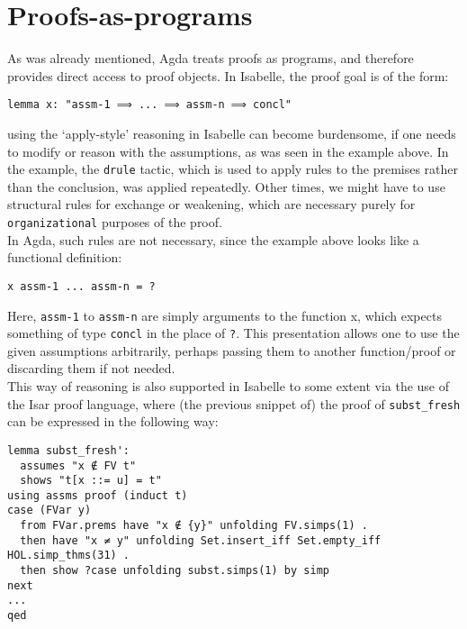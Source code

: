 \documentclass[a4paper, 12pt, twoside]{style/ociamthesis}
\theoremstyle{plain}
\theoremstyle{definition}
\theoremstyle{remark}
\begin{document}
\section{Proofs-as-programs}\label{proofs-as-programs}

\label{proofAsProg}

As was already mentioned, Agda treats proofs as programs, and therefore
provides direct access to proof objects. In Isabelle, the proof goal is
of the form:

\begin{verbatim}
lemma x: "assm-1 ⟹ ... ⟹ assm-n ⟹ concl"
\end{verbatim}

using the `apply-style' reasoning in Isabelle can become burdensome, if
one needs to modify or reason with the assumptions, as was seen in the
example above. In the example, the \texttt{drule} tactic, which is used
to apply rules to the premises rather than the conclusion, was applied
repeatedly. Other times, we might have to use structural rules for
exchange or weakening, which are necessary purely for
\texttt{organizational} purposes of the proof.\\
In Agda, such rules are not necessary, since the example above looks
like a functional definition:

\begin{verbatim}
x assm-1 ... assm-n = ?
\end{verbatim}

Here, \texttt{assm-1} to \texttt{assm-n} are simply arguments to the
function x, which expects something of type \texttt{concl} in the place
of \texttt{?}. This presentation allows one to use the given assumptions
arbitrarily, perhaps passing them to another function/proof or
discarding them if not needed.\\
This way of reasoning is also supported in Isabelle to some extent via
the use of the Isar proof language, where (the previous snippet of) the
proof of \texttt{subst\_fresh} can be expressed in the following way:

\begin{verbatim}
lemma subst_fresh': 
  assumes "x ∉ FV t"
  shows "t[x ::= u] = t"
using assms proof (induct t)
case (FVar y)
  from FVar.prems have "x ∉ {y}" unfolding FV.simps(1) .
  then have "x ≠ y" unfolding Set.insert_iff Set.empty_iff HOL.simp_thms(31) .
  then show ?case unfolding subst.simps(1) by simp
next
...
qed
\end{verbatim}
\end{document}
